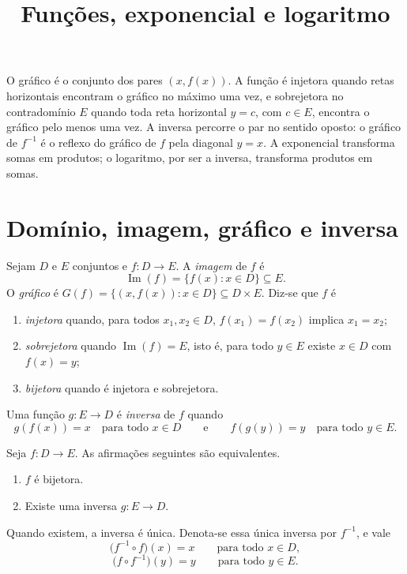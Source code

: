 \documentclass[11pt,a4paper]{article}
\title{Funções, exponencial e logaritmo}
\author{}
\date{}
\begin{document}
\maketitle
\tableofcontents


\begin{intuicao}
O gráfico é o conjunto dos pares $(x,f(x))$. A função é injetora quando retas horizontais encontram o gráfico no máximo uma vez, e sobrejetora no contradomínio $E$ quando toda reta horizontal $y=c$, com $c\in E$, encontra o gráfico pelo menos uma vez. A inversa percorre o par no sentido oposto: o gráfico de $f^{-1}$ é o reflexo do gráfico de $f$ pela diagonal $y=x$. A exponencial transforma somas em produtos; o logaritmo, por ser a inversa, transforma produtos em somas.
\end{intuicao}

\section{Domínio, imagem, gráfico e inversa}

\begin{definicao}
Sejam $D$ e $E$ conjuntos e $f\colon D\to E$. A \emph{imagem} de $f$ é
\[
\operatorname{Im}(f)=\{f(x):x\in D\}\subseteq E.
\]
O \emph{gráfico} é $G(f)=\{(x,f(x)):x\in D\}\subseteq D\times E$. Diz-se que $f$ é
\begin{enumerate}
\item \emph{injetora} quando, para todos $x_1,x_2\in D$, $f(x_1)=f(x_2)$ implica $x_1=x_2$;
\item \emph{sobrejetora} quando $\operatorname{Im}(f)=E$, isto é, para todo $y\in E$ existe $x\in D$ com $f(x)=y$;
\item \emph{bijetora} quando é injetora e sobrejetora.
\end{enumerate}
Uma função $g\colon E\to D$ é \emph{inversa} de $f$ quando
\[
g(f(x))=x\quad\text{para todo }x\in D
\qquad\text{e}\qquad
f(g(y))=y\quad\text{para todo }y\in E.
\]
\end{definicao}

\begin{teorema}\label{teo:inversa}
Seja $f\colon D\to E$. As afirmações seguintes são equivalentes.
\begin{enumerate}
\item $f$ é bijetora.
\item Existe uma inversa $g\colon E\to D$.
\end{enumerate}
Quando existem, a inversa é única. Denota-se essa única inversa por $f^{-1}$, e vale
\[
\bigl(f^{-1}\circ f\bigr)(x)=x\qquad\text{para todo }x\in D,
\]
\[
\bigl(f\circ f^{-1}\bigr)(y)=y\qquad\text{para todo }y\in E.
\]
\end{teorema}
\end{document}
